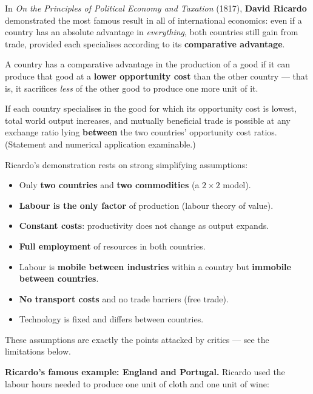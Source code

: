 \documentclass[11pt]{article}
\newcommand{\cle}[1]{{\popxbold\color{popdark}#1}}
\begin{document}
In \emph{On the Principles of Political Economy and Taxation} (1817), \textbf{David Ricardo} demonstrated the most famous result in all of international economics: even if a country has an absolute advantage in \emph{everything}, both countries still gain from trade, provided each specialises according to its \textbf{comparative advantage}.

\begin{definition}
A country has a \cle{comparative advantage} in the production of a good if it can produce that good at a \textbf{lower opportunity cost} than the other country --- that is, it sacrifices \emph{less} of the other good to produce one more unit of it.
\end{definition}

\begin{propriete}
If each country specialises in the good for which its opportunity cost is lowest, total world output increases, and mutually beneficial trade is possible at any exchange ratio lying \textbf{between} the two countries' opportunity cost ratios. (Statement and numerical application examinable.)
\end{propriete}

\begin{aretenir}
Ricardo's demonstration rests on strong simplifying assumptions:
\begin{itemize}
\item Only \textbf{two countries} and \textbf{two commodities} (a $2\times 2$ model).
\item \textbf{Labour is the only factor} of production (labour theory of value).
\item \textbf{Constant costs}: productivity does not change as output expands.
\item \textbf{Full employment} of resources in both countries.
\item Labour is \textbf{mobile between industries} within a country but \textbf{immobile between countries}.
\item \textbf{No transport costs} and no trade barriers (free trade).
\item Technology is fixed and differs between countries.
\end{itemize}
These assumptions are exactly the points attacked by critics --- see the limitations below.
\end{aretenir}

\textbf{Ricardo's famous example: England and Portugal.} Ricardo used the labour hours needed to produce one unit of cloth and one unit of wine:
\end{document}
